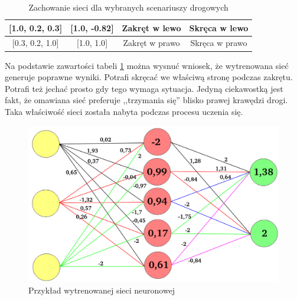 \begin{table}[]
\begin{tabular}{|c|c|c|c|}
{[}1.0, 0.2, 0.3{]}     & {[}1.0, -0.82{]}                                                         & Zakręt w lewo                                                                                     & Skręca w lewo                                                                \\ \hline
{[}0.3, 0.2, 1.0{]}     & {[}1.0, 1.0{]}                                                           & Zakręt w prawo                                                                                    & Skręca w prawo                                                               \\ \hline
\end{tabular}
\caption{Zachowanie sieci dla wybranych scenariuszy drogowych}
\label{InputOutputExamples}
\end{table}

Na podstawie zawartości tabeli \ref{InputOutputExamples} można wysnuć wniosek, że wytrenowana sieć generuje poprawne wyniki. Potrafi skręcać we właściwą stronę podczas zakrętu. Potrafi też jechać prosto gdy tego wymaga sytuacja. Jedyną ciekawostką jest fakt, że omawiana sieć preferuje ,,trzymania się'' blisko prawej krawędzi drogi. Taka właściwość sieci została nabyta podczas procesu uczenia się.

\vspace{1.5cm}
\begin{figure}[H]
\centering
\includegraphics[width=15cm]{resources/figures/trained_model_example.png}
\caption{Przykład wytrenowanej sieci neuronowej}
\label{TrainedNetworkExample}
\end{figure}